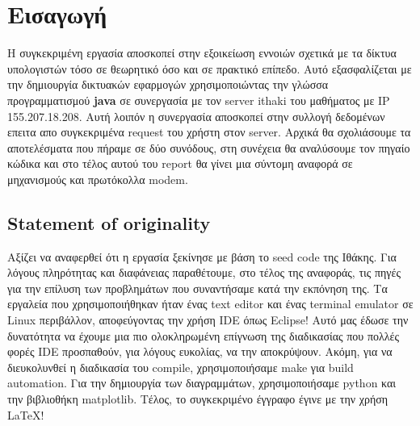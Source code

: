 \documentclass[hidelinks, 12pt, a4paper]{article}
\begin{document}
\sloppy %




\pagebreak
{
\renewcommand*\contentsname{Περιεχόμενα}
\hypersetup{linkcolor=black}
\tableofcontents
}
\pagebreak



\section{Εισαγωγή}

Η συγκεκριμένη εργασία αποσκοπεί στην εξοικείωση εννοιών σχετικά με τα δίκτυα υπολογιστών τόσο σε θεωρητικό όσο και σε πρακτικό επίπεδο. Αυτό εξασφαλίζεται με την δημιουργία δικτυακών εφαρμογών χρησιμοποιώντας την γλώσσα προγραμματισμού \textbf{java} σε συνεργασία με τον server ithaki του μαθήματος με IP 155.207.18.208. Αυτή λοιπόν η συνεργασία αποσκοπεί στην συλλογή δεδομένων επειτα απο συγκεκριμένα request του χρήστη στον server. Αρχικά θα σχολιάσουμε τα αποτελέσματα που πήραμε σε δύο συνόδους, στη συνέχεια θα αναλύσουμε τον πηγαίο κώδικα και στο τέλος αυτού του report θα γίνει μια σύντομη αναφορά σε μηχανισμούς και πρωτόκολλα modem.

\subsection{Statement of originality}

Αξίζει να αναφερθεί ότι η εργασία ξεκίνησε με βάση το seed code της Ιθάκης. Για λόγους πληρότητας και διαφάνειας παραθέτουμε, στο τέλος της αναφοράς, τις πηγές για την επίλυση των προβλημάτων που συναντήσαμε κατά την εκπόνηση της. Τα εργαλεία που χρησιμοποιήθηκαν ήταν ένας text editor και ένας terminal emulator σε Linux περιβάλλον, αποφεύγοντας την χρήση IDE όπως Eclipse! Αυτό μας έδωσε την δυνατότητα να έχουμε μια πιο ολοκληρωμένη επίγνωση της διαδικασίας που πολλές φορές IDE προσπαθούν, για λόγους ευκολίας, να την αποκρύψουν. Ακόμη, για να διευκολυνθεί η διαδικασία του compile, χρησιμοποιήσαμε make για build automation. Για την δημιουργία των διαγραμμάτων, χρησιμοποιήσαμε python και την βιβλιοθήκη matplotlib. Τέλος, το συγκεκριμένο έγγραφο έγινε με την χρήση \LaTeX! 
\end{document}
